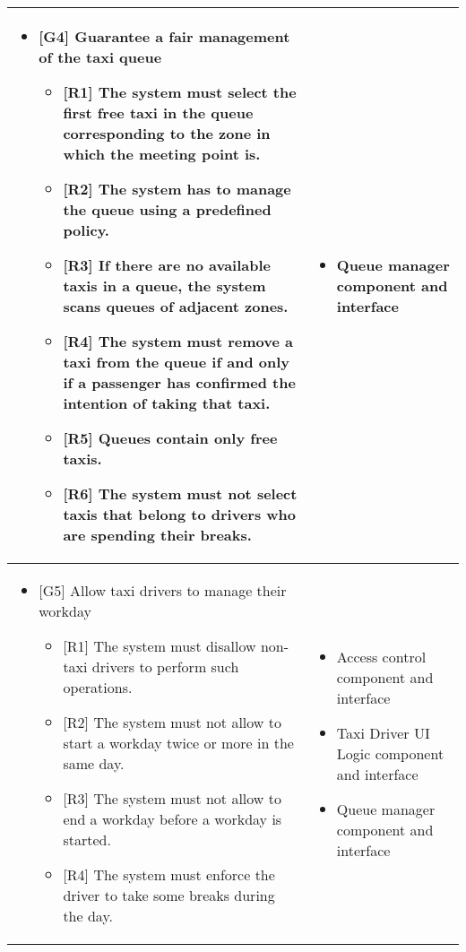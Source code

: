 \begin{center}
\begin{longtable}{|p{}|p{}|}
\begin{itemize}
	\item {[}G4{]} Guarantee a fair management of the taxi queue
	\begin{itemize}
		\item {[}R1{]} The system must select the first free taxi in the queue corresponding to the zone in which the meeting point is.
		\item {[}R2{]} The system has to manage the queue using a predefined policy.
		\item {[}R3{]} If there are no available taxis in a queue, the system scans queues of adjacent zones.
		\item {[}R4{]} The system must remove a taxi from the queue if and only if a passenger has confirmed the intention of taking that taxi.
		\item {[}R5{]} Queues contain only free taxis.
		\item {[}R6{]} The system must not select taxis that belong to drivers who are spending their breaks.
	\end{itemize}
	\end{itemize} & \begin{itemize}\item Queue manager component and interface\end{itemize}\\
	\hline
	\MPtrue
	\begin{itemize}
	\item {[}G5{]} Allow taxi drivers to manage their workday
	\begin{itemize}
	\item {[}R1{]} The system must disallow non-taxi drivers to perform such operations.
	\item {[}R2{]} The system must not allow to start a workday twice or more in the same day.
	\item {[}R3{]} The system must not allow to end a workday before a workday is started.
	\item {[}R4{]} The system must enforce the driver to take some breaks during the day.
	\end{itemize}\end{itemize} &\MPtrue \begin{itemize}
	\item Access control component and interface
	\item Taxi Driver UI Logic component and interface
	\item Queue manager component and interface
\end{itemize} \\

\end{longtable}
\end{center}
